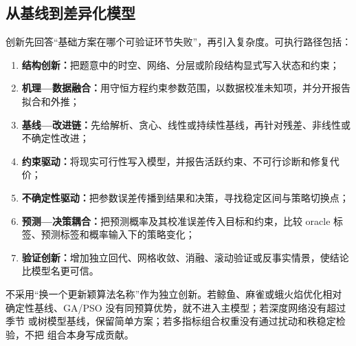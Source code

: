 \subsection{从基线到差异化模型}

创新先回答“基础方案在哪个可验证环节失败”，再引入复杂度。可执行路径包括：
\begin{enumerate}
  \item \textbf{结构创新：}把题意中的时空、网络、分层或阶段结构显式写入状态和约束；
  \item \textbf{机理—数据融合：}用守恒方程约束参数范围，以数据校准未知项，并分开报告拟合和外推；
  \item \textbf{基线—改进链：}先给解析、贪心、线性或持续性基线，再针对残差、非线性或不确定性改进；
  \item \textbf{约束驱动：}将现实可行性写入模型，并报告活跃约束、不可行诊断和修复代价；
  \item \textbf{不确定性驱动：}把参数误差传播到结果和决策，寻找稳定区间与策略切换点；
  \item \textbf{预测—决策耦合：}把预测概率及其校准误差传入目标和约束，比较 oracle 标签、预测标签和概率输入下的策略变化；
  \item \textbf{验证创新：}增加独立回代、网格收敛、消融、滚动验证或反事实情景，使结论比模型名更可信。
\end{enumerate}

不采用“换一个更新颖算法名称”作为独立创新。若鲸鱼、麻雀或蛾火焰优化相对
确定性基线、GA/PSO 没有同预算优势，就不进入主模型；若深度网络没有超过季节
或树模型基线，保留简单方案；若多指标组合权重没有通过扰动和秩稳定检验，不把
组合本身写成贡献。
